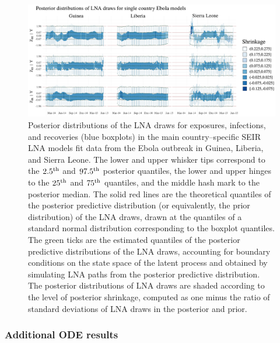 \begin{figure}
	\begin{fullpage}
		\centering
		\includegraphics[width=\linewidth]{figures/ebola_single_drawplots}
		\caption[Posterior distributions of LNA draws for the main country--specific SEIR models fit to data from the West Africa Ebola outbreak.]{Posterior distributions of the LNA draws for exposures, infections, and recoveries (blue boxplots) in the main country--specific SEIR LNA models fit data from the Ebola outbreak in Guinea, Liberia, and Sierra Leone. The lower and upper whisker tips correspond to the $ 2.5^{\mathrm{th}} $ and $ 97.5^{\mathrm{th}} $ posterior quantiles, the lower and upper hinges to the $ 25^{\mathrm{th}} $ and $ 75^{\mathrm{th}} $ quantiles, and the middle hash mark to the posterior median. The solid red lines are the theoretical quantiles of the posterior predictive distribution (or equivalently, the prior distribution) of the LNA draws, drawn at the quantiles of a standard normal distribution corresponding to the boxplot quantiles. The green ticks are the estimated quantiles of the posterior predictive distributions of the LNA draws, accounting for boundary conditions on the state space of the latent process and obtained by simulating LNA paths from the posterior predictive distribution.  The posterior distributions of LNA draws are shaded according to the level of posterior shrinkage, computed as one minus the ratio of standard deviations of LNA draws in the posterior and prior.}
		\label{fig:ebola_single_drawplots}
	\end{fullpage}
\end{figure}

\subsubsection{Additional ODE results}
\label{subsubsec:ebola_single_res_ode}

